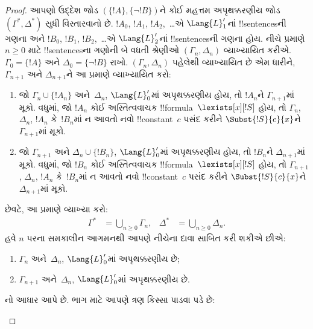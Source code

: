 \documentclass[../../../include/open-logic-section]{subfiles}
\begin{document}
\begin{proof}
આપણો ઉદ્દેશ જોડ $(\{ !A \}, \{\lnot!B\})$ને કોઈ મહત્તમ
અપૃથક્કરણીય જોડ $(\Gamma^*, \Delta^*)$ સુધી વિસ્તારવાનો છે.
$!A_0$, $!A_1$, $!A_2$,~\dots એ $\Lang{L}'_1$નાં !!{sentence}sની
ગણના અને $!B_0$, $!B_1$, $!B_2$,~\dots એ $\Lang{L}'_2$નાં
!!{sentence}sની ગણના હોય. નીચે પ્રમાણે $n\ge0$ માટે !!{sentence}sના
ગણોની બે વધતી શ્રેણીઓ $(\Gamma_n,\Delta_n)$ વ્યાખ્યાયિત કરીએ. $\Gamma_0
= \{!A\}$ અને $\Delta_0=\{\lnot !B\}$ રાખો. $(\Gamma_n,\Delta_n)$
પહેલેથી વ્યાખ્યાયિત છે એમ ધારીને, $\Gamma_{n+1}$ અને
$\Delta_{n+1}$ને આ પ્રમાણે વ્યાખ્યાયિત કરો:
\begin{enumerate}
\item જો $\Gamma_n \cup \{!A_n \}$ અને~$\Delta_n$, $\Lang{L}'_0$માં
  અપૃથક્કરણીય હોય, તો $!A_n$ને $\Gamma_{n+1}$માં મૂકો. વધુમાં, જો
  $!A_n$ કોઈ અસ્તિત્વવાચક !!{formula}~$\lexists[x][!S]$ હોય, તો
  $\Gamma_n$, $\Delta_n$, $!A_n$ કે~$!B_n$માં ન આવતો નવો
  !!{constant}~$c$ પસંદ કરીને $\Subst{!S}{c}{x}$ને
  $\Gamma_{n+1}$માં મૂકો.
\item જો $\Gamma_{n+1}$ અને $\Delta_n \cup \{!B_n \}$,
  $\Lang{L}'_0$માં અપૃથક્કરણીય હોય, તો $!B_n$ને $\Delta_{n+1}$માં
  મૂકો. વધુમાં, જો $!B_n$ કોઈ અસ્તિત્વવાચક
  !!{formula}~$\lexists[x][!S]$ હોય, તો $\Gamma_{n+1}$, $\Delta_n$,
  $!A_n$ કે~$!B_n$માં ન આવતો નવો !!{constant}~$c$ પસંદ કરીને
  $\Subst{!S}{c}{x}$ને $\Delta_{n+1}$માં મૂકો.
\end{enumerate}
છેવટે, આ પ્રમાણે વ્યાખ્યા કરો:
\begin{align*}
  \Gamma^* & = \bigcup_{n\ge 0} \Gamma_n, &
  \Delta^* & = \bigcup_{n\ge 0} \Delta_n.
\end{align*}
હવે $n$ પરના સમકાલીન આગમનથી આપણે નીચેના દાવા સાબિત કરી શકીએ છીએ:
\begin{enumerate}
\item{} $\Gamma_n$ અને~$\Delta_n$, $\Lang{L}'_0$માં
  અપૃથક્કરણીય છે;
\item{} $\Gamma_{n+1}$ અને~$\Delta_n$,
  $\Lang{L}'_0$માં અપૃથક્કરણીય છે.
\end{enumerate}
નો આધાર  આપે છે. ભાગ
 માટે આપણે ત્રણ કિસ્સા પાડવા પડે છે:
\begin{enumerate}

\end{enumerate}
\end{proof}
\end{document}
